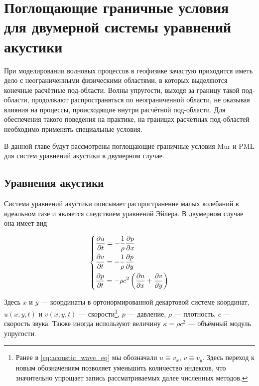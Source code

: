 \section{Поглощающие граничные условия для двумерной системы уравнений акустики} \label{sec:absorbing}

При моделировании волновых процессов в геофизике зачастую приходится иметь дело с неограниченными физическими областями, в которых выделяются конечные расчётные под-области. Волны упругости, выходя за границу такой под-области, продолжают распространяться по неограниченной области, не оказывая влияния на процессы, происходящие внутри расчётной под-области. Для обеспечения такого поведения на практике,  на границах расчётных под-областей необходимо применять специальные условия.

В данной главе будут рассмотрены поглощающие граничные условия Mur и PML для систем уравнений акустики в двумерном случае.

\subsection{Уравнения акустики}


Система уравнений акустики описывает распространение малых колебаний в идеальном газе и является следствием уравнений Эйлера. В двумерном случае она имеет вид

\begin{equation}
\begin{dcases}
	\frac{\partial u}{\partial t} = -\frac{1}{\rho}\frac{\partial p}{\partial x} \\
	\frac{\partial v}{\partial t} = -\frac{1}{\rho}\frac{\partial p}{\partial y} \\
    \frac{\partial p}{\partial t} = -\rho c^2 \left(\frac{\partial u}{\partial x} + \frac{\partial v}{\partial y}\right) \\
\end{dcases}
\label{eq:acoustic}
\end{equation}

Здесь $x$ и $y$ --- координаты в ортонормированной декартовой системе координат, $u(x,y,t)$ и $v(x,y,t)$ --- скорости\footnote{Ранее в \eqref{eq:acoustic_wave_eq} мы обозначали $u\equiv v_x$, $v\equiv v_y$. Здесь переход к новым обозначениям позволяет уменьшить количество индексов, что значительно упрощает запись рассматриваемых далее численных методов.}, $p$ --- давление, $\rho$ --- плотность, $c$ --- скорость звука. Также иногда используют величину $\kappa = \rho c^2$ --- объёмный модуль упругости.

